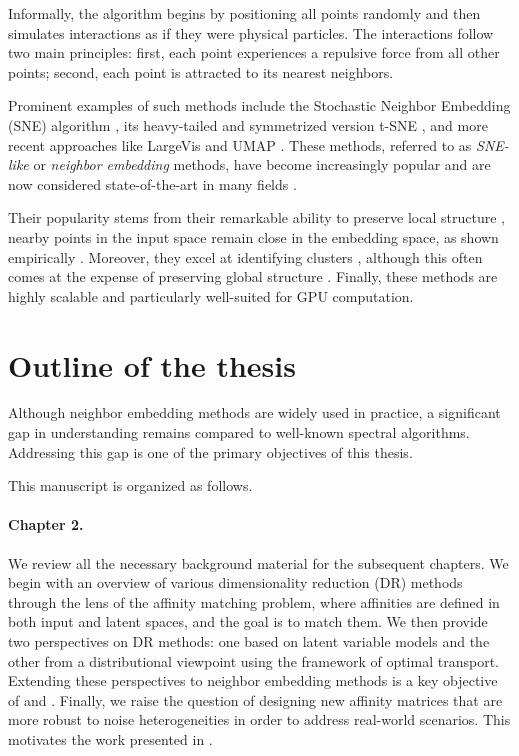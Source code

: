 Informally, the algorithm begins by positioning all points randomly and then simulates interactions as if they were physical particles. The interactions follow two main principles: first, each point experiences a repulsive force from all other points; second, each point is attracted to its nearest neighbors.

Prominent examples of such methods include the Stochastic Neighbor Embedding (SNE) algorithm \citep{NIPS2002SNE}, its heavy-tailed and symmetrized version t-SNE \citep{maaten2008tSNE}, and more recent approaches like LargeVis \citep{tang2016visualizing} and UMAP \citep{mcinnes2018umap}. These methods, referred to as \textit{SNE-like} or \textit{neighbor embedding} methods, have become increasingly popular and are now considered state-of-the-art in many fields \citep{li2017application,kobak2019art,anders2018dissecting}.
 
Their popularity stems from their remarkable ability to preserve local structure \ie, nearby points in the input space remain close in the embedding space, as shown empirically \citep{wang2021understanding}. Moreover, they excel at identifying clusters \citep{arora2018analysis, linderman2019clustering}, although this often comes at the expense of preserving global structure \citep{wattenberg2016use, coenen2019understanding}. Finally, these methods are highly scalable and particularly well-suited for GPU computation.

\section{Outline of the thesis}

Although neighbor embedding methods are widely used in practice, a significant gap in understanding remains compared to well-known spectral algorithms. Addressing this gap is one of the primary objectives of this thesis.

This manuscript is organized as follows.

\paragraph{Chapter 2.}
We review all the necessary background material for the subsequent chapters. We begin with an overview of various dimensionality reduction (DR) methods through the lens of the affinity matching problem, where affinities are defined in both input and latent spaces, and the goal is to match them. We then provide two perspectives on DR methods: one based on latent variable models and the other from a distributional viewpoint using the framework of optimal transport. Extending these perspectives to neighbor embedding methods is a key objective of  and . Finally, we raise the question of designing new affinity matrices that are more robust to noise heterogeneities in order to address real-world scenarios. This motivates the work presented in .


